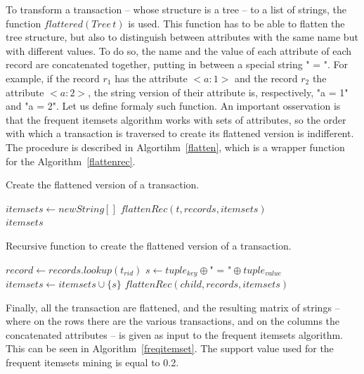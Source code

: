 \documentclass{acm_proc_article-sp-sigmod09}
\begin{document}
To transform a transaction -- whose structure is a tree -- to a list of strings, the function $flattered(Tree \, t)$ is used. This function has to be able to flatten the tree structure, but also to distinguish between attributes with the same name but with different values. To do so, the name and the value of each attribute of each record are concatenated together, putting in between a special string " = ". For example, if the record $r_1$ has the attribute $<a \colon 1>$ and the record $r_2$ the attribute $<a \colon 2>$, the string version of their attribute is, respectively, "a = 1" and "a = 2". Let us define formaly such function. An important osservation is that the frequent itemsets algorithm works with sets of attributes, so the order with which a transaction is traversed to create its flattened version is indifferent. The procedure is described in Algortihm~\ref{flatten}, which is a wrapper function for the Algorithm~\ref{flattenrec}.

\begin{algorithm}
\caption{Create the flattened version of a transaction.}
\label{flatten}
\begin{algorithmic}[1]
\State $itemsets \gets new String[]$
\State $flattenRec(t, records, itemsets)$ \\
\Return $itemsets$
\EndFunction
\end{algorithmic}
\end{algorithm}

\begin{algorithm}
\caption{Recursive function to create the flattened version of a transaction.}
\label{flattenrec}
\begin{algorithmic}[1]
\State $record \gets records.lookup(t_{rid})$
	\State $s \gets tuple_{key} \oplus \text{" = "} \oplus tuple_{value}$
	\State $itemsets \gets itemsets \cup \{s\}$
\EndFor
{}
	\State $flattenRec(child, records, itemsets)$
\EndFor
\EndFunction
\end{algorithmic}
\end{algorithm}

Finally, all the transaction are flattened, and the resulting matrix of strings -- where on the rows there are the various transactions, and on the columns the concatenated attributes -- is given as input to the frequent itemsets algorithm. This can be seen in Algorithm~\ref{freqitemset}. The support value used for the frequent itemsets mining is equal to 0.2.
\end{document}
